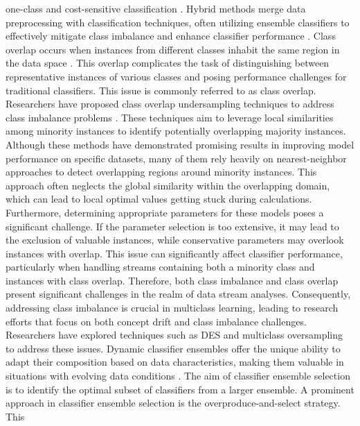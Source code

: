   one-class and cost-sensitive classification \cite{zhang2020towards}. Hybrid methods merge data preprocessing with classification techniques, often utilizing ensemble classifiers to effectively mitigate class imbalance and enhance classifier performance \cite{chawla2003smoteboost}\cite{wang2010negative}\cite{bhowan2012evolving}.
  Class overlap occurs when instances from different classes inhabit the same region in the data space \cite{galar2011review}\cite{cruz2018dynamic}. This overlap complicates the task of distinguishing between representative instances of various classes and posing performance challenges for traditional classifiers. This issue is commonly referred to as class overlap. Researchers have proposed class overlap undersampling
  techniques to address class imbalance problems \cite{kuncheva2000clustering}. These techniques aim to leverage local similarities among minority instances to
  identify potentially overlapping majority instances. Although these methods have demonstrated promising results in improving model
  performance on specific datasets, many of them rely heavily on nearest-neighbor approaches to detect overlapping regions around
  minority instances. This approach often neglects the global similarity within the overlapping domain, which can lead to local optimal
  values getting stuck during calculations. Furthermore, determining appropriate parameters for these models poses a significant
  challenge. If the parameter selection is too extensive, it may lead to the exclusion of valuable instances, while conservative parameters
  may overlook instances with overlap. This issue can significantly affect classifier performance, particularly when handling streams
  containing both a minority class and instances with class overlap. Therefore, both class imbalance and class overlap present significant
  challenges in the realm of data stream analyses. Consequently, addressing class imbalance is crucial in multiclass learning, leading to
  research efforts that focus on both concept drift and class imbalance challenges. Researchers have explored techniques such as DES and
  multiclass oversampling to address these issues.
  Dynamic classifier ensembles offer the unique ability to adapt their composition based on data characteristics, making them
  valuable in situations with evolving data conditions \cite{woloszynski2011probabilistic}. The aim of classifier ensemble selection is to identify the optimal subset of
  classifiers from a larger ensemble. A prominent approach in classifier ensemble selection is the overproduce-and-select strategy. This
